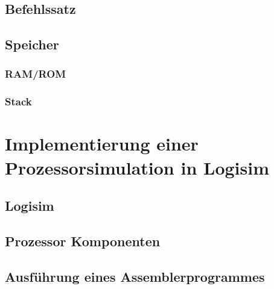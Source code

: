 \documentclass[12pt]{article}
\begin{document}
\subsection{Befehlssatz}
\subsection{Speicher}
\subsubsection{RAM/ROM}
\subsubsection{Stack}

\section{Implementierung einer Prozessorsimulation in Logisim}
\subsection{Logisim}
\subsection{Prozessor Komponenten}
\subsection{Ausführung eines Assemblerprogrammes}

\newpage

\end{document}
